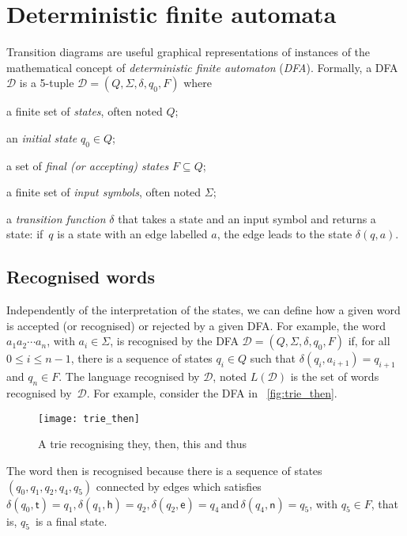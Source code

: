 \section{Deterministic finite automata}
 
Transition diagrams are useful graphical representations of instances
of the mathematical concept of \emph{deterministic finite automaton}
(\emph{DFA}). Formally, a DFA \(\mathcal{D}\) is a 5-tuple
\(\mathcal{D} = (Q, \Sigma, \delta, q_0, F)\) where
\begin{enumerate*}

  \item a finite set of \emph{states}, often noted \(Q\);

  \item an \emph{initial state} \(q_0 \in Q\);

  \item a set of \emph{final (\emph{or} accepting)
  states} \(F \subseteq Q\);

  \item a finite set of \emph{input symbols}, often noted \(\Sigma\);

  \item a \emph{transition function} \(\delta\) that takes a state and
    an input symbol and returns a state: if~\(q\) is a state with an
    edge labelled \(a\), the edge leads to the state \(\delta(q, a)\).

\end{enumerate*}

\subsection*{Recognised words}

Independently of the interpretation of the states, we can define how a
given word is accepted (or recognised) or rejected by a given DFA. For
example, the word \(a_1 a_2 \cdots a_n\), with \(a_i \in \Sigma\), is
recognised by the DFA \(\mathcal{D} = (Q, \Sigma, \delta, q_0, F)\)
if, for all \(0 \leqslant i \leqslant n-1\), there is a sequence of
states \(q_i \in Q\) such that \(\delta (q_i, a_{i+1}) = q_{i+1}\) and
\(q_n \in F\). The language recognised by \(\mathcal{D}\), noted
\(L(\mathcal{D})\) is the set of words recognised
by~\(\mathcal{D}\). For example, consider the DFA in
\fig~\vref{fig:trie_then}.
\begin{figure}[b]
\centering
\texttt{[image: trie\_then]}
\caption{A trie recognising \textsf{they}, \textsf{then},
  \textsf{this} and \textsf{thus} \label{fig:trie_then}}
\end{figure}
The word \textsf{then} is recognised because there is a sequence of
states \((q_0, q_1, q_2, q_4, q_5)\) connected by edges which
satisfies \(\delta (q_0, \textsf{t}) = q_1, \delta (q_1, \textsf{h}) =
q_2, \delta (q_2, \textsf{e}) = q_4 \,\text{and}\, \delta (q_4,
\textsf{n}) = q_5\), with \(q_5 \in F\), that is, \(q_5\)~is a final
state.

